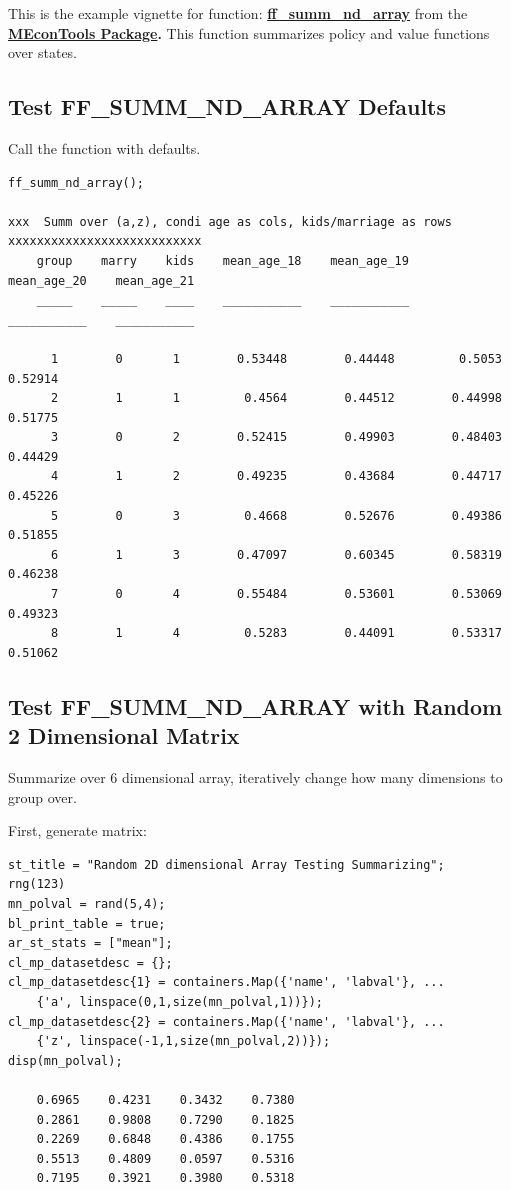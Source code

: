\documentclass[
]{book}
\begin{document}
This is the example vignette for function:
\href{https://github.com/FanWangEcon/MEconTools/blob/master/MEconTools/summ/ff_summ_nd_array.m}{\textbf{ff\_summ\_nd\_array}}
from the \href{https://fanwangecon.github.io/MEconTools/}{\textbf{MEconTools
Package}}\textbf{.} This function
summarizes policy and value functions over states.

\hypertarget{test-ff_summ_nd_array-defaults}{%
\subsection{Test FF\_SUMM\_ND\_ARRAY Defaults}\label{test-ff_summ_nd_array-defaults}}

Call the function with defaults.

\begin{verbatim}
ff_summ_nd_array();

xxx  Summ over (a,z), condi age as cols, kids/marriage as rows  xxxxxxxxxxxxxxxxxxxxxxxxxxx
    group    marry    kids    mean_age_18    mean_age_19    mean_age_20    mean_age_21
    _____    _____    ____    ___________    ___________    ___________    ___________

      1        0       1        0.53448        0.44448         0.5053        0.52914  
      2        1       1         0.4564        0.44512        0.44998        0.51775  
      3        0       2        0.52415        0.49903        0.48403        0.44429  
      4        1       2        0.49235        0.43684        0.44717        0.45226  
      5        0       3         0.4668        0.52676        0.49386        0.51855  
      6        1       3        0.47097        0.60345        0.58319        0.46238  
      7        0       4        0.55484        0.53601        0.53069        0.49323  
      8        1       4         0.5283        0.44091        0.53317        0.51062  
\end{verbatim}

\hypertarget{test-ff_summ_nd_array-with-random-2-dimensional-matrix}{%
\subsection{Test FF\_SUMM\_ND\_ARRAY with Random 2 Dimensional Matrix}\label{test-ff_summ_nd_array-with-random-2-dimensional-matrix}}

Summarize over 6 dimensional array, iteratively change how many
dimensions to group over.

First, generate matrix:

\begin{verbatim}
st_title = "Random 2D dimensional Array Testing Summarizing";
rng(123)
mn_polval = rand(5,4);
bl_print_table = true;
ar_st_stats = ["mean"];
cl_mp_datasetdesc = {};
cl_mp_datasetdesc{1} = containers.Map({'name', 'labval'}, ...
    {'a', linspace(0,1,size(mn_polval,1))});
cl_mp_datasetdesc{2} = containers.Map({'name', 'labval'}, ...
    {'z', linspace(-1,1,size(mn_polval,2))});
disp(mn_polval);

    0.6965    0.4231    0.3432    0.7380
    0.2861    0.9808    0.7290    0.1825
    0.2269    0.6848    0.4386    0.1755
    0.5513    0.4809    0.0597    0.5316
    0.7195    0.3921    0.3980    0.5318
\end{verbatim}
\end{document}
